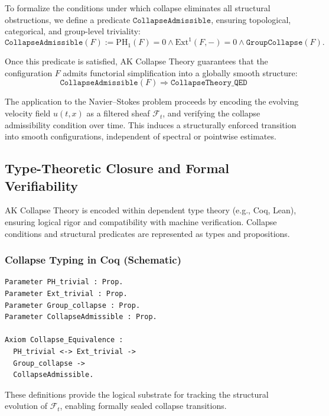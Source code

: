 \documentclass[11pt]{article}
\begin{document}
To formalize the conditions under which collapse eliminates all structural obstructions, we define a predicate \( \texttt{CollapseAdmissible} \), ensuring topological, categorical, and group-level triviality:
\begin{equation}
\texttt{CollapseAdmissible}(F) := \mathrm{PH}_1(F) = 0 \wedge \mathrm{Ext}^1(F, -) = 0 \wedge \texttt{GroupCollapse}(F).
\end{equation}

Once this predicate is satisfied, AK Collapse Theory guarantees that the configuration \( F \) admits functorial simplification into a globally smooth structure:
\begin{equation}
\boxed{
\texttt{CollapseAdmissible}(F) \Rightarrow \texttt{CollapseTheory\_QED}
}
\end{equation}

The application to the Navier--Stokes problem proceeds by encoding the evolving velocity field \( u(t,x) \) as a filtered sheaf \( \mathcal{F}_t \), and verifying the collapse admissibility condition over time. This induces a structurally enforced transition into smooth configurations, independent of spectral or pointwise estimates.

\subsection{Type-Theoretic Closure and Formal Verifiability}

AK Collapse Theory is encoded within dependent type theory (e.g., Coq, Lean), ensuring logical rigor and compatibility with machine verification. Collapse conditions and structural predicates are represented as types and propositions.

\subsubsection*{Collapse Typing in Coq (Schematic)}
\begin{lstlisting}
Parameter PH_trivial : Prop.
Parameter Ext_trivial : Prop.
Parameter Group_collapse : Prop.
Parameter CollapseAdmissible : Prop.

Axiom Collapse_Equivalence :
  PH_trivial <-> Ext_trivial ->
  Group_collapse ->
  CollapseAdmissible.
\end{lstlisting}

These definitions provide the logical substrate for tracking the structural evolution of \( \mathcal{F}_t \), enabling formally sealed collapse transitions.
\end{document}
